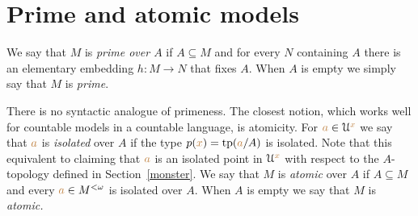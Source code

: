 \section{Prime and atomic models}

We say that $M$ is \emph{prime over $A$\/} if $A\subseteq M$ and for every $N$ containing $A$ there is an elementary embedding $h:M\to N$ that fixes $A$.
When $A$ is empty we simply say that $M$ is \emph{prime}.

There is no syntactic analogue of primeness.
The closest notion, which works well for countable models in a countable language, is atomicity.
For ${\color{brown} a}\in\EuScript U^{\color{brown} x}$ we say that ${\color{brown} a}$ is  \emph{isolated\/} over $A$ if the type $p({\color{brown} x})={\rm tp}({\color{brown} a}/A)$ is isolated.
Note that this equivalent to claiming that ${\color{brown} a}$ is an isolated point in $\EuScript U^{\color{brown} x}$ with respect to the $A$-topology defined in Section~\ref{monster}.
We say that $M$ is \emph{atomic\/} over $A$ if $A\subseteq M$ and every ${\color{brown} a}\in M^{<\omega}$ is isolated over $A$.
When $A$ is empty we say that $M$ is \emph{atomic.}


